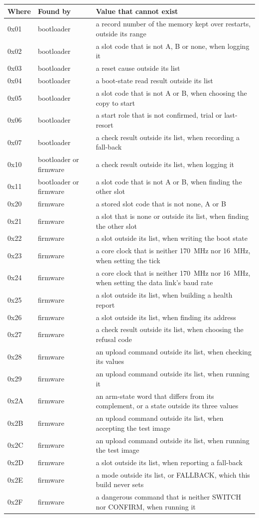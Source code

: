 \documentclass[11pt,a4paper]{article}
\begin{document}
{\footnotesize\noindent\begin{tabularx}{\textwidth}{@{}llX@{}}
\toprule
Where & Found by & Value that cannot exist \\
\midrule
0x01 & bootloader & a record number of the memory kept over restarts, outside its range \\
0x02 & bootloader & a slot code that is not A, B or none, when logging it \\
0x03 & bootloader & a reset cause outside its list \\
0x04 & bootloader & a boot-state read result outside its list \\
0x05 & bootloader & a slot code that is not A or B, when choosing the copy to start \\
0x06 & bootloader & a start role that is not confirmed, trial or last-resort \\
0x07 & bootloader & a check result outside its list, when recording a fall-back \\
0x10 & bootloader or firmware & a check result outside its list, when logging it \\
0x11 & bootloader or firmware & a slot code that is not A or B, when finding the other slot \\
0x20 & firmware & a stored slot code that is not none, A or B \\
0x21 & firmware & a slot that is none or outside its list, when finding the other slot \\
0x22 & firmware & a slot outside its list, when writing the boot state \\
0x23 & firmware & a core clock that is neither 170~MHz nor 16~MHz, when setting the tick \\
0x24 & firmware & a core clock that is neither 170~MHz nor 16~MHz, when setting the data link's baud rate \\
0x25 & firmware & a slot outside its list, when building a health report \\
0x26 & firmware & a slot outside its list, when finding its address \\
0x27 & firmware & a check result outside its list, when choosing the refusal code \\
0x28 & firmware & an upload command outside its list, when checking its values \\
0x29 & firmware & an upload command outside its list, when running it \\
0x2A & firmware & an arm-state word that differs from its complement, or a state outside its three values \\
0x2B & firmware & an upload command outside its list, when accepting the test image \\
0x2C & firmware & an upload command outside its list, when running the test image \\
0x2D & firmware & a slot outside its list, when reporting a fall-back \\
0x2E & firmware & a mode outside its list, or FALLBACK, which this build never sets \\
0x2F & firmware & a dangerous command that is neither SWITCH nor CONFIRM, when running it \\
\bottomrule
\end{tabularx}}
\end{document}
